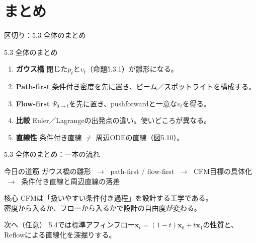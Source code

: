 \section{まとめ}
\asmain
\begin{frame}{区切り：5.3 全体のまとめ}
    \tableofcontents[currentsection]
\end{frame}
\asmain
\begin{frame}{5.3 全体のまとめ}
    \begin{enumerate}
        \item \textbf{ガウス橋}
        閉じた$p_t$と$v_t$（命題5.3.1）が雛形になる。
        \item \textbf{Path-first}
        条件付き密度を先に置き、ビーム／スポットライトを構成する。
        \item \textbf{Flow-first}
        $\Psi_{0\to t}$を先に置き、pushforwardと一意な$v_t$を得る。
        \item \textbf{比較}
        Euler／Lagrangeの出発点の違い。使いどころが異なる。
        \item \textbf{直線性}
        条件付き直線 $\neq$ 周辺ODEの直線（図5.10）。
    \end{enumerate}
\end{frame}
\asmain
\begin{frame}{5.3 全体のまとめ：一本の流れ}
    \begin{block}{今日の道筋}
        ガウス橋の雛形
        $\;\to\;$
        path-first / flow-first
        $\;\to\;$
        CFM目標の具体化
        $\;\to\;$
        条件付き直線と周辺直線の落差
    \end{block}
    \begin{block}{核心}
        CFMは「扱いやすい条件付き過程」を設計する工学である。\\
        密度から入るか、フローから入るかで設計の自由度が変わる。
    \end{block}
    \begin{block}{次へ（任意）}
        5.4では標準アフィンフロー$\bm{x}_t=(1-t)\bm{x}_0+t\bm{x}_1$の性質と、\\
        Reflowによる直線化を深掘りする。
    \end{block}
\end{frame}
